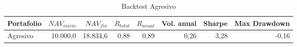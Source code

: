 \begin{table}[htbp]
\centering
\begin{tabular}{lrrrrrrr}
\hline
Portafolio & $NAV_{inicio}$ & $NAV_{fin}$ & $R_{total}$ & $R_{anual}$ & Vol. anual & Sharpe & Max Drawdown \\
\hline
Agresivo & 10{.}000{,}0 & 18{.}834{,}6 & 0,88 & 0,89 & 0,26 & 3,28 & -0,16 \\
\hline
\end{tabular}
\caption{Backtest Agresivo}
\label{tab:backtest-aggressive}
\end{table}